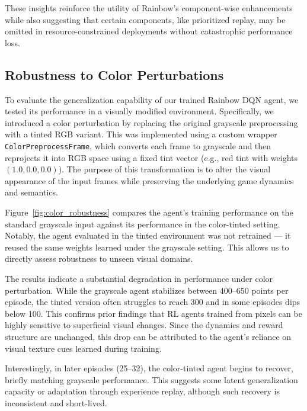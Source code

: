 \documentclass{article}
\begin{document}
These insights reinforce the utility of Rainbow’s component-wise enhancements while also suggesting that certain components, like prioritized replay, may be omitted in resource-constrained deployments without catastrophic performance loss.

\subsection{Robustness to Color Perturbations}

To evaluate the generalization capability of our trained Rainbow DQN agent, we tested its performance in a visually modified environment. Specifically, we introduced a color perturbation by replacing the original grayscale preprocessing with a tinted RGB variant. This was implemented using a custom wrapper \texttt{ColorPreprocessFrame}, which converts each frame to grayscale and then reprojects it into RGB space using a fixed tint vector (e.g., red tint with weights $(1.0, 0.0, 0.0)$). The purpose of this transformation is to alter the visual appearance of the input frames while preserving the underlying game dynamics and semantics.

Figure~\ref{fig:color_robustness} compares the agent’s training performance on the standard grayscale input against its performance in the color-tinted setting. Notably, the agent evaluated in the tinted environment was not retrained — it reused the same weights learned under the grayscale setting. This allows us to directly assess robustness to unseen visual domains.

The results indicate a substantial degradation in performance under color perturbation. While the grayscale agent stabilizes between 400–650 points per episode, the tinted version often struggles to reach 300 and in some episodes dips below 100. This confirms prior findings \cite{zhang2020investigation} that RL agents trained from pixels can be highly sensitive to superficial visual changes. Since the dynamics and reward structure are unchanged, this drop can be attributed to the agent’s reliance on visual texture cues learned during training.

Interestingly, in later episodes (25–32), the color-tinted agent begins to recover, briefly matching grayscale performance. This suggests some latent generalization capacity or adaptation through experience replay, although such recovery is inconsistent and short-lived.
\end{document}
